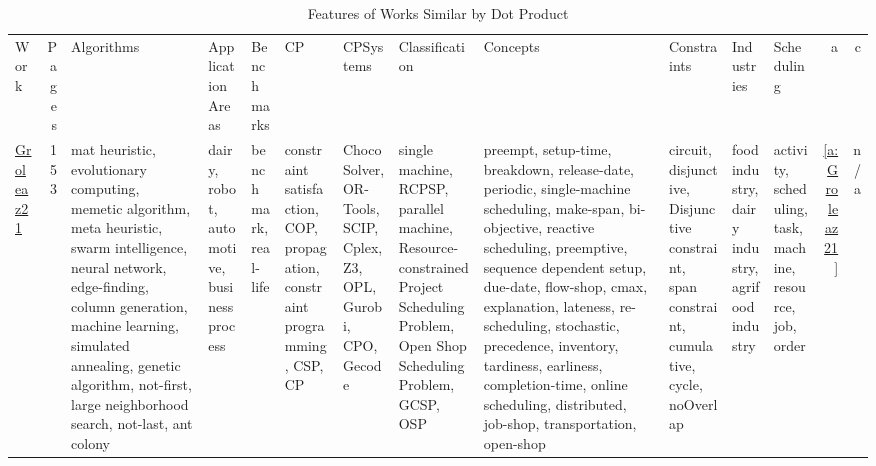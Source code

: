{\scriptsize
\begin{longtable}{>{\raggedright\arraybackslash}p{3cm}r>{\raggedright\arraybackslash}p{1.5cm}>{\raggedright\arraybackslash}p{1.5cm}>{\raggedright\arraybackslash}p{1.5cm}>{\raggedright\arraybackslash}p{1.5cm}>{\raggedright\arraybackslash}p{1.5cm}>{\raggedright\arraybackslash}p{1.5cm}>{\raggedright\arraybackslash}p{1.5cm}>{\raggedright\arraybackslash}p{1.5cm}>{\raggedright\arraybackslash}p{1.5cm}>{\raggedright\arraybackslash}p{1.5cm}rr}
\rowcolor{white}\caption{Features of Works Similar by Dot Product}\\ \toprule
\rowcolor{white}Work & Pages & Algorithms& ApplicationAreas& Benchmarks& CP& CPSystems& Classification& Concepts& Constraints& Industries& Scheduling & a & c\\ \midrule\endhead
\bottomrule
\endfoot
\href{../works/Groleaz21.pdf}{Groleaz21}~\cite{Groleaz21} & 153 & mat heuristic, evolutionary computing, memetic algorithm, meta heuristic, swarm intelligence, neural network, edge-finding, column generation, machine learning, simulated annealing, genetic algorithm, not-first, large neighborhood search, not-last, ant colony & dairy, robot, automotive, business process & benchmark, real-life & constraint satisfaction, COP, propagation, constraint programming, CSP, CP & Choco Solver, OR-Tools, SCIP, Cplex, Z3, OPL, Gurobi, CPO, Gecode & single machine, RCPSP, parallel machine, Resource-constrained Project Scheduling Problem, Open Shop Scheduling Problem, GCSP, OSP & preempt, setup-time, breakdown, release-date, periodic, single-machine scheduling, make-span, bi-objective, reactive scheduling, preemptive, sequence dependent setup, due-date, flow-shop, cmax, explanation, lateness, re-scheduling, stochastic, precedence, inventory, tardiness, earliness, completion-time, online scheduling, distributed, job-shop, transportation, open-shop & circuit, disjunctive, Disjunctive constraint, span constraint, cumulative, cycle, noOverlap & food industry, dairy industry, agrifood industry & activity, scheduling, task, machine, resource, job, order & \ref{a:Groleaz21} & n/a\\

\end{longtable}}
